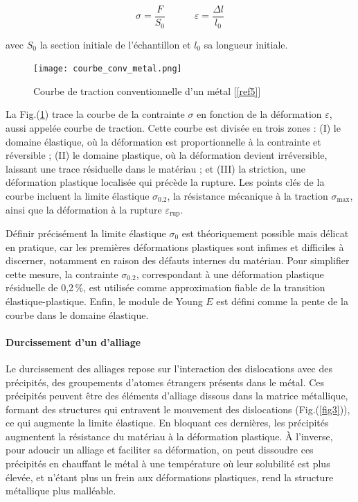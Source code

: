 \documentclass[a4paper, 12pt,oneside]{article}
\begin{document}
\begin{equation}
    \sigma = \frac{F}{S_0} \quad \quad \quad \varepsilon = \frac{\Delta l}{l_0}
\label{eq1}
\end{equation}

\noindent 
avec $S_0$  la section initiale de l’échantillon et $l_0$ sa longueur initiale. \\

\begin{figure}
    \centering
    \texttt{[image: courbe\_conv\_metal.png]}
    \captionsetup{justification=centering}
    \caption{Courbe de traction conventionnelle d'un métal [\ref{ref5}]}
    \label{fig2}
\end{figure}

La Fig.(\ref{fig2}) trace la courbe de la contrainte $\sigma$ en fonction de la déformation $\varepsilon$, aussi appelée courbe de traction. Cette courbe est divisée en trois zones : (I) le domaine élastique, où la déformation est proportionnelle à la contrainte et réversible ; (II) le domaine plastique, où la déformation devient irréversible, laissant une trace résiduelle dans le matériau ; et (III) la striction, une déformation plastique localisée qui précède la rupture. Les points clés de la courbe incluent la limite élastique $\sigma_{0.2}$, la résistance mécanique à la traction $\sigma_{\text{max}}$, ainsi que la déformation à la rupture $\varepsilon_{\text{rup}}$.

Définir précisément la limite élastique $\sigma_0$ est théoriquement possible mais délicat en pratique, car les premières déformations plastiques sont infimes et difficiles à discerner, notamment en raison des défauts internes du matériau. Pour simplifier cette mesure, la contrainte $\sigma_{0.2}$, correspondant à une déformation plastique résiduelle de 0,2\,\%, est utilisée comme approximation fiable de la transition élastique-plastique. Enfin, le module de Young $E$ est défini comme la pente de la courbe dans le domaine élastique.

\paragraph{Durcissement d'un d'alliage}

Le durcissement des alliages repose sur l'interaction des dislocations avec des précipités, des groupements d'atomes étrangers présents dans le métal. Ces précipités peuvent être des éléments d'alliage dissous dans la matrice métallique, formant des structures qui entravent le mouvement des dislocations (Fig.(\ref{fig3})), ce qui augmente la limite élastique. En bloquant ces dernières, les précipités augmentent la résistance du matériau à la déformation plastique. À l'inverse, pour adoucir un alliage et faciliter sa déformation, on peut dissoudre ces précipités en chauffant le métal à une température où leur solubilité est plus élevée, et n'étant plus un frein aux déformations plastiques, rend la structure métallique plus malléable.
\end{document}
